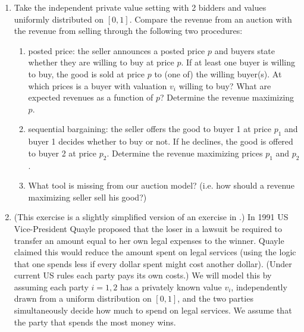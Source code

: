 \documentclass[a4paper,12pt]{article}
\begin{document}
\begin{enumerate}
\item Take the independent private value setting with 2 bidders and values uniformly distributed on $[0,1]$. Compare the revenue from an auction with the revenue from selling through the following two procedures:
  \begin{enumerate}
  \item posted price: the seller announces a posted price $p$ and buyers state whether they are willing to buy at price $p$. If at least one buyer is willing to buy, the good is sold at price $p$ to (one of) the willing buyer(s). At which prices is a buyer with valuation $v_i$ willing to buy? What are expected revenues as a function of $p$? Determine the revenue maximizing $p$.
  \item sequential bargaining: the seller offers the good to buyer 1 at price $p_1$ and buyer 1 decides whether to buy or not. If he declines, the good is offered to buyer 2 at price $p_2$. Determine the revenue maximizing prices $p_1$ and $p_2$.
  \item What tool is missing from our auction model? (i.e. how should a revenue maximizing seller sell his good?)
  \end{enumerate}
\item (This exercise is a slightly simplified version of an exercise in \cite{klemperer2004auctions}.) In 1991 US Vice-President Quayle proposed that the loser in a lawsuit be required to transfer an amount equal to her own legal expenses to the winner. Quayle claimed this would reduce the amount spent on legal services (using the logic that one spends less if every dollar spent might cost another dollar). (Under current US rules each party pays its own costs.) We will model this by assuming each party $i=1, 2$ has a privately known value $v_i$, independently drawn from a uniform distribution on $[0,1]$, and the two parties simultaneously decide how much to spend on legal services. We assume that the party that spends the most money wins.

\end{enumerate}
\end{document}

